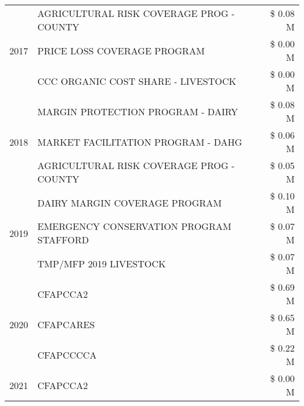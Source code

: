 \begin{tabular}{llr}
\cline{1-3}
\multirow[t]{3}{*}{2017} & AGRICULTURAL RISK COVERAGE PROG - COUNTY & \$ 0.08 M \\
 & PRICE LOSS COVERAGE PROGRAM & \$ 0.00 M \\
 & CCC ORGANIC COST SHARE - LIVESTOCK & \$ 0.00 M \\
\cline{1-3}
\multirow[t]{3}{*}{2018} & MARGIN PROTECTION PROGRAM - DAIRY & \$ 0.08 M \\
 & MARKET FACILITATION PROGRAM - DAHG & \$ 0.06 M \\
 & AGRICULTURAL RISK COVERAGE PROG - COUNTY & \$ 0.05 M \\
\cline{1-3}
\multirow[t]{3}{*}{2019} & DAIRY MARGIN COVERAGE PROGRAM & \$ 0.10 M \\
 & EMERGENCY CONSERVATION PROGRAM STAFFORD & \$ 0.07 M \\
 & TMP/MFP 2019 LIVESTOCK & \$ 0.07 M \\
\cline{1-3}
\multirow[t]{3}{*}{2020} & CFAPCCA2 & \$ 0.69 M \\
 & CFAPCARES & \$ 0.65 M \\
 & CFAPCCCCA & \$ 0.22 M \\
\cline{1-3}
2021 & CFAPCCA2 & \$ 0.00 M \\
\cline{1-3}
\bottomrule
\end{tabular}
